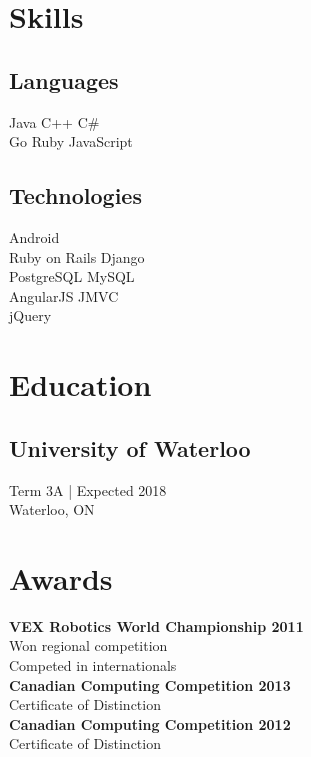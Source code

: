 \documentclass[]{peter_resume}
\begin{document}
\hfill
\begin{minipage}[t]{0.22\textwidth} 


\section{Skills}
\subsection{Languages}
Java \textbullet{}
C++ \textbullet{}
C\# \\
Go \textbullet{}
Ruby \textbullet{}
JavaScript \\
\subsection{Technologies}
Android \\
Ruby on Rails \textbullet{}
Django \\
PostgreSQL \textbullet{}
MySQL \\
AngularJS \textbullet{}
JMVC \\
jQuery
\sectionsep


\section{Education} 
\subsection{University of Waterloo}
Term 3A | Expected 2018\\
Waterloo, ON
\sectionsep


\section{Awards} 
\textbf {VEX Robotics World Championship 2011}\\
Won regional competition\\
Competed in internationals\\
\vspace{0.1cm}
\textbf {Canadian Computing Competition 2013}\\
Certificate of Distinction\\
\vspace{0.1cm}
\textbf {Canadian Computing Competition 2012}\\
Certificate of Distinction\\
\sectionsep


\end{minipage}
\end{document}

